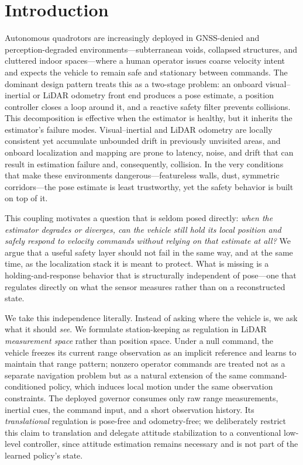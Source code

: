 \documentclass[11pt]{article}
\providecommand{\IEEEPARstart}[2]{#1#2}
\begin{document}
\section{Introduction}

\IEEEPARstart{A}{utonomous} quadrotors are increasingly deployed in
GNSS-denied and perception-degraded environments---subterranean voids,
collapsed structures, and cluttered indoor spaces---where a human operator
issues coarse velocity intent and expects the vehicle to remain safe and
stationary between commands. The dominant design pattern treats this as a
two-stage problem: an onboard visual--inertial or LiDAR odometry front end
produces a pose estimate, a position controller closes a loop around it, and a
reactive safety filter prevents collisions. This decomposition is effective
when the estimator is healthy, but it inherits the estimator's failure modes.
Visual--inertial and LiDAR odometry are locally consistent yet accumulate
unbounded drift in previously unvisited areas\cite{sprind2025}, and onboard
localization and mapping are prone to latency, noise, and drift that can
result in estimation failure and, consequently, collision\cite{neuralcbf2024}.
In the very conditions that make these environments dangerous---featureless
walls, dust, symmetric corridors---the pose estimate is least trustworthy,
yet the safety behavior is built on top of it.

This coupling motivates a question that is seldom posed directly:
\emph{when the estimator degrades or diverges, can the vehicle still hold its
local position and safely respond to velocity commands without relying on that
estimate at all?} We argue that a useful safety layer should not fail in the
same way, and at the same time, as the localization stack it is meant to
protect. What is missing is a holding-and-response behavior that is
structurally independent of pose---one that regulates directly on what the
sensor measures rather than on a reconstructed state.

We take this independence literally. Instead of asking where the vehicle is,
we ask what it should \emph{see}. We formulate station-keeping as regulation
in LiDAR \emph{measurement space} rather than position space. Under a null
command, the vehicle freezes its current range observation as an implicit
reference and learns to maintain that range pattern; nonzero operator commands
are treated not as a separate navigation problem but as a natural extension of
the same command-conditioned policy, which induces local motion under the same
observation constraints. The deployed governor consumes only raw range
measurements, inertial cues, the command input, and a short observation
history. Its \emph{translational} regulation is pose-free and odometry-free;
we deliberately restrict this claim to translation and delegate attitude
stabilization to a conventional low-level controller, since attitude
estimation remains necessary and is not part of the learned policy's state.
\end{document}
